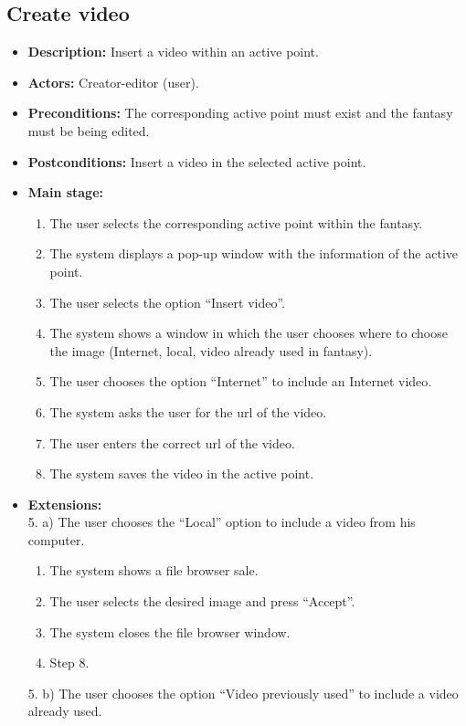 \subsection{Create video}
\begin{itemize}
	\item \textbf{Description:} Insert a video within an active point.
	\item \textbf{Actors:} Creator-editor (user).
	\item \textbf{Preconditions:} The corresponding active point must exist and the fantasy must be being edited.
	\item \textbf{Postconditions:} Insert a video in the selected active point.
	\item \textbf{Main stage:}
	\begin{enumerate}
		\item The user selects the corresponding active point within the fantasy.
		\item The system displays a pop-up window with the information of the active point.
		\item The user selects the option ``Insert video''.
		\item The system shows a window in which the user chooses where to choose the image (Internet, local, video already used in fantasy).
		\item The user chooses the option ``Internet'' to include an Internet video.
		\item The system asks the user for the url of the video.
		\item The user enters the correct url of the video.
		\item The system saves the video in the active point.
	\end{enumerate}
	\item \textbf{Extensions:} \\ 5. a) The user chooses the ``Local'' option to include a video from his computer.
	\begin{enumerate}
		\item The system shows a file browser sale.
		\item The user selects the desired image and press ``Accept''.
		\item The system closes the file browser window.
		\item Step 8.
	\end{enumerate}
	5. b) The user chooses the option ``Video previously used'' to include a video already used.
	\begin{enumerate}

\end{enumerate}
\end{itemize}
